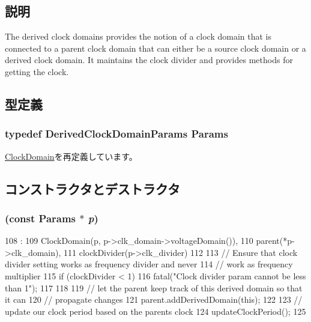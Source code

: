 \subsection{説明}
The derived clock domains provides the notion of a clock domain that is connected to a parent clock domain that can either be a source clock domain or a derived clock domain. It maintains the clock divider and provides methods for getting the clock. 

\subsection{型定義}
\hypertarget{classDerivedClockDomain_a10c51f81ae9968953f7d5c0ee20546c6}{
\subsubsection[{Params}]{\setlength{\rightskip}{0pt plus 5cm}typedef DerivedClockDomainParams {\bf Params}}}
\label{classDerivedClockDomain_a10c51f81ae9968953f7d5c0ee20546c6}


\hyperlink{classClockDomain_a38704c6bd51f0677b46da34c8fe16a38}{ClockDomain}を再定義しています。

\subsection{コンストラクタとデストラクタ}
\hypertarget{classDerivedClockDomain_a816eac6a1295742a75f85f70e144ac18}{
\subsubsection[{DerivedClockDomain}]{ (const {\bf Params} $\ast$ {\em p})}}
\label{classDerivedClockDomain_a816eac6a1295742a75f85f70e144ac18}



\begin{DoxyCode}
108                                                       :
109     ClockDomain(p, p->clk_domain->voltageDomain()),
110     parent(*p->clk_domain),
111     clockDivider(p->clk_divider)
112 {
113     // Ensure that clock divider setting works as frequency divider and never
114     // work as frequency multiplier
115     if (clockDivider < 1) {
116        fatal("Clock divider param cannot be less than 1");
117     }
118 
119     // let the parent keep track of this derived domain so that it can
120     // propagate changes
121     parent.addDerivedDomain(this);
122 
123     // update our clock period based on the parents clock
124     updateClockPeriod();
125 }

\end{DoxyCode}


